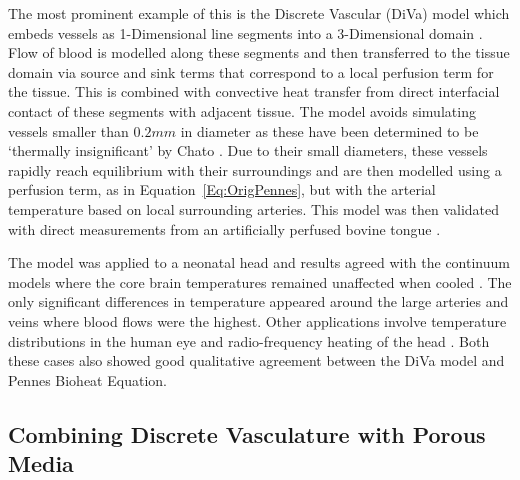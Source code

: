 \documentclass[11pt,english,a4paper,twoside,openright]{report}
\begin{document}
{{{{{{{{	The most prominent example of this is the Discrete Vascular (DiVa) model which embeds vessels as 1-Dimensional line segments into a 3-Dimensional domain \cite{kotte1996description}. Flow of blood is modelled along these segments and then transferred to the tissue domain via source and sink terms that correspond to a local perfusion term for the tissue. This is combined with convective heat transfer from direct interfacial contact of these segments with adjacent tissue. The model avoids simulating vessels smaller than $0.2mm$ in diameter \cite{kotte1999modelling} as these have been determined to be `thermally insignificant' by Chato \cite{chato1980heat}. Due to their small diameters, these vessels rapidly reach equilibrium with their surroundings and are then modelled using a perfusion term, as in Equation~\ref{Eq:OrigPennes}, but with the arterial temperature based on local surrounding arteries. This model was then validated with direct measurements from an artificially perfused bovine tongue \cite{raaymakers2000modelling}. 
	
	The model was applied to a neonatal head and results agreed with the continuum models where the core brain temperatures remained unaffected when cooled \cite{van2000numerical}. The only significant differences in temperature appeared around the large arteries and veins where blood flows were the highest. Other applications involve temperature distributions in the human eye \cite{flyckt2006modelling} and radio-frequency heating of the head \cite{van2012radiofrequency}. Both these cases also showed good qualitative agreement between the DiVa model and Pennes Bioheat Equation. 
	
	\subsection{Combining Discrete Vasculature with Porous Media}	
	
}}}}}}}}
\end{document}
